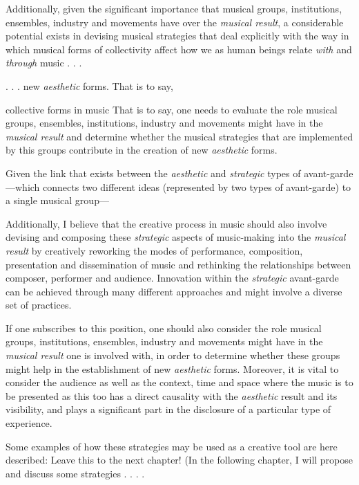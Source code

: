 Additionally, given the significant importance that musical groups, institutions, ensembles, industry and movements have over the \emph{musical result}, a considerable potential exists in devising musical strategies that deal explicitly with the way in which musical forms of collectivity affect how we as human beings relate \emph{with} and \emph{through} music . . . 

. . . new \emph{aesthetic} forms. That is to say, 

collective forms in music That is to say,  one needs to evaluate the role musical groups, ensembles, institutions, industry and movements might have in the \emph{musical result} and determine whether the musical strategies that are implemented by this groups contribute in the creation of new \emph{aesthetic} forms.

Given the link that exists between the \emph{aesthetic} and \emph{strategic} types of avant-garde---which connects two different ideas (represented by two types of avant-garde) to a single musical group--- 



Additionally, I believe that the creative process in music should also involve devising and composing these \emph{strategic} aspects of music-making into the \emph{musical result} by creatively reworking the modes of performance, composition, presentation and dissemination of music and rethinking the relationships between composer, performer and audience. Innovation within the \emph{strategic} avant-garde can be achieved through many different approaches and might involve a diverse set of practices. 


If one subscribes to this position, one should also consider the role musical groups, institutions, ensembles, industry and movements might have in the \emph{musical result} one is involved with, in order to determine whether these groups might help in the establishment of new \emph{aesthetic} forms. Moreover, it is vital to consider the audience as well as the context, time and space where the music is to be presented as this too has a direct causality with the \emph{aesthetic} result and its visibility, and plays a significant part in the disclosure of a particular type of experience. 


Some examples of how these strategies may be used as a creative tool are here described: Leave this to the next chapter! (In the following chapter, I will propose and discuss some strategies . . . .


